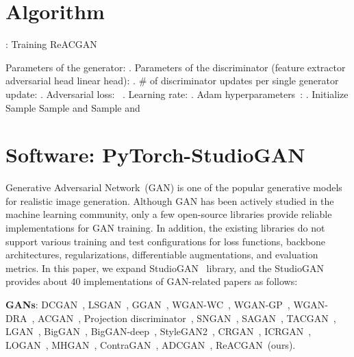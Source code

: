 \documentclass{article}
\begin{document}
\section{Algorithm}
\label{algorithm}
\renewcommand{\algorithmicrequire}{\textbf{Input:}}
\renewcommand{\algorithmicprocedure}{\textbf{For}}
\renewcommand{\algorithmicensure}{\textbf{Output:}}
\begin{algorithm}[H]
\caption{: Training ReACGAN}\label{alg:algorithm}
\begin{algorithmic}[1]
\Statex \quad \; Parameters of the generator: .
\Statex \quad \; Parameters of the discriminator (feature extractor  adversarial head  linear head): .  
\Statex \quad \;  \# of discriminator updates per single generator update: .
\Statex \quad \;  Adversarial loss: ~\cite{Goodfellow2014GenerativeAN, Mao2017LeastSG, Gulrajani2017ImprovedTO, Lim2017GeometricG}.
\Statex \quad \; Learning rate: . Adam hyperparameters~\cite{Kingma2015AdamAM}: .
\Statex
\State Initialize 
    \For{}
    \State Sample 
    \State Sample  and 
    \State 
    \State  
    \State 
    \EndFor
\State Sample  and 
\State 
\State  
{}
\State 
\EndFor
\end{algorithmic}
\end{algorithm} \section{Software: PyTorch-StudioGAN}
Generative Adversarial Network~(GAN) is one of the popular generative models for realistic image generation. Although GAN has been actively studied in the machine learning community, only a few open-source libraries provide reliable implementations for GAN training. In addition, the existing libraries do not support various training and test configurations for loss functions, backbone architectures, regularizations, differentiable augmentations, and evaluation metrics. In this paper, we expand StudioGAN~\cite{studiogan} library, and the StudioGAN provides about 40 implementations of GAN-related papers as follows:

\textbf{GANs}: DCGAN~\cite{Radford2016UnsupervisedRL}, LSGAN~\cite{Mao2017LeastSG}, GGAN~\cite{Lim2017GeometricG}, WGAN-WC~\cite{Arjovsky2017WassersteinG}, WGAN-GP~\cite{Gulrajani2017ImprovedTO}, WGAN-DRA~\cite{Kodali2018OnCA}, ACGAN~\cite{Odena2017ConditionalIS}, Projection discriminator~\cite{Miyato2018cGANsWP}, SNGAN~\cite{Miyato2018SpectralNF}, SAGAN~\cite{Zhang2019SelfAttentionGA}, TACGAN~\cite{NIPS2019_8414},  LGAN~\cite{zhou2019lipschitz}, BigGAN~\cite{Brock2019LargeSG}, BigGAN-deep~\cite{Brock2019LargeSG}, StyleGAN2~\cite{karras2020analyzing}, CRGAN~\cite{Zhang2019ConsistencyRF}, ICRGAN~\cite{Zhao2020ImprovedCR}, LOGAN~\cite{Wu2019LOGANLO}, MHGAN~\cite{kavalerov2021multi}, ContraGAN~\cite{kang2020contragan}, ADCGAN~\cite{hou2021cgans}, ReACGAN~(ours).
\end{document}
